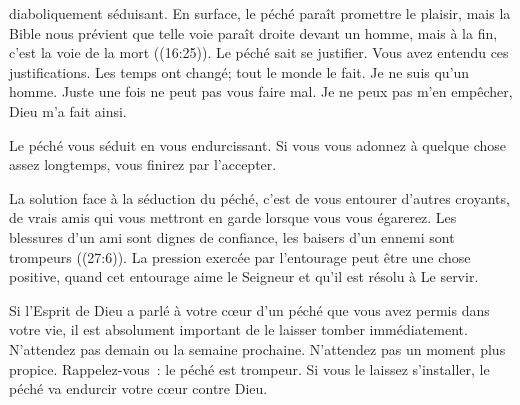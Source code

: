 \dvrule






 diaboliquement séduisant.
 En surface, le péché paraît promettre le plaisir,
 mais la Bible nous prévient que \og telle 
 voie paraît droite devant un homme, mais à la fin,
 c'est la voie de la mort \fg{} ((16:25)).
 Le péché sait se justifier. Vous avez entendu ces justifications.
 \og Les temps ont changé; tout le monde le fait. \fg{}
 \og Je ne suis qu'un homme. \fg{}
 \og Juste une fois ne peut pas vous faire mal. \fg{}
 \og Je ne peux pas m'en empêcher, Dieu m'a fait ainsi. \fg{}


Le péché vous séduit en vous endurcissant.
 Si vous vous adonnez à quelque chose assez longtemps,
 vous finirez par l'accepter. 

La solution face à la séduction du péché, c'est de vous entourer
 d'autres croyants, de vrais amis qui vous mettront en garde
 lorsque vous vous égarerez.
 \og Les blessures d'un ami sont dignes de confiance,
 les baisers d'un ennemi sont trompeurs \fg{} ((27:6)).
 La pression exercée par l'entourage peut être une chose positive,
 quand cet entourage aime le Seigneur et qu'il est résolu à Le servir. 

Si l'Esprit de Dieu a parlé à votre cœur d'un péché que vous avez permis
 dans votre vie, il est absolument important de le laisser tomber
 immédiatement.
 N'attendez pas demain ou la semaine prochaine.
 N'attendez pas un moment plus propice. Rappelez-vous~:
 le péché est trompeur.
 Si vous le laissez s'installer,
 le péché va endurcir votre cœur contre Dieu. 

\dvrule



